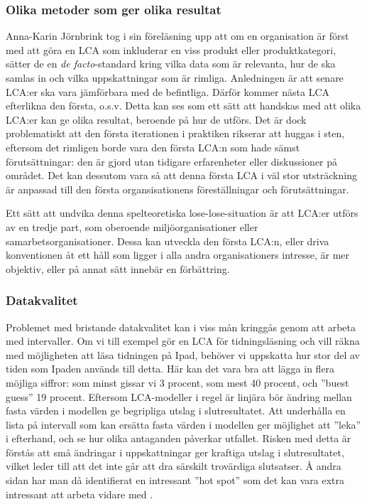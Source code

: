 \documentclass{article}
\begin{document}
\subsubsection{Olika metoder som ger olika resultat}

Anna-Karin Jörnbrink tog i sin föreläsning upp att om en organisation är först med att göra en LCA som inkluderar en viss produkt eller produktkategori, sätter de en \emph{de facto}-standard kring vilka data som är relevanta, hur de ska samlas in och vilka uppskattningar som är rimliga. Anledningen är att senare LCA:er ska vara jämförbara med de befintliga. Därför kommer nästa LCA efterlikna den första, o.s.v. Detta kan ses som ett sätt att handskas med att olika LCA:er kan ge olika resultat, beroende på hur de utförs. Det är dock problematiskt att den första iterationen i praktiken rikserar att huggas i sten, eftersom det rimligen borde vara den första LCA:n som hade sämst förutsättningar: den är gjord utan tidigare erfarenheter eller diskussioner på området. Det kan dessutom vara så att denna första LCA i väl stor utsträckning är anpassad till den första organsisationens föreställningar och förutsättningar. 

Ett sätt att undvika denna spelteoretiska lose-lose-situation är att LCA:er utförs av en tredje part, som oberoende miljöorganisationer eller samarbetsorganisationer. Dessa kan utveckla den första LCA:n, eller driva konventionen åt ett håll som ligger i alla andra organisationers intresse, är mer objektiv, eller på annat sätt innebär en förbättring.

\subsubsection{Datakvalitet}

Problemet med bristande datakvalitet kan i viss mån kringgås genom att arbeta med intervaller. Om vi till exempel gör en LCA för tidningsläsning och vill räkna med möjligheten att läsa tidningen på Ipad, behöver vi uppskatta hur stor del av tiden som Ipaden används till detta. Här kan det vara bra att lägga in flera möjliga siffror: som minst gissar vi 3 procent, som mest 40 procent, och ''buest guess'' 19 procent. Eftersom LCA-modeller i regel är linjära bör ändring mellan fasta värden i modellen ge begripliga utslag i slutresultatet. Att underhålla en lista på intervall som kan ersätta fasta värden i modellen ger möjlighet att ''leka'' i efterhand, och se hur olika antaganden påverkar utfallet. Risken med detta är förstås att små ändringar i uppskattningar ger kraftiga utslag i slutresultatet, vilket leder till att det inte går att dra särskilt trovärdiga slutsatser. Å andra sidan har man då identifierat en intressant ''hot spot'' som det kan vara extra intressant att arbeta vidare med .
\end{document}

